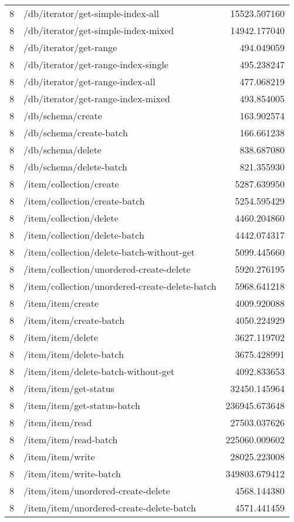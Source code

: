 \begin{longtable}{rlr}
8 & /db/iterator/get-simple-index-all & 15523.507160 \\
8 & /db/iterator/get-simple-index-mixed & 14942.177040 \\
8 & /db/iterator/get-range & 494.049059 \\
8 & /db/iterator/get-range-index-single & 495.238247 \\
8 & /db/iterator/get-range-index-all & 477.068219 \\
8 & /db/iterator/get-range-index-mixed & 493.854005 \\
8 & /db/schema/create & 163.902574 \\
8 & /db/schema/create-batch & 166.661238 \\
8 & /db/schema/delete & 838.687080 \\
8 & /db/schema/delete-batch & 821.355930 \\
8 & /item/collection/create & 5287.639950 \\
8 & /item/collection/create-batch & 5254.595429 \\
8 & /item/collection/delete & 4460.204860 \\
8 & /item/collection/delete-batch & 4442.074317 \\
8 & /item/collection/delete-batch-without-get & 5099.445660 \\
8 & /item/collection/unordered-create-delete & 5920.276195 \\
8 & /item/collection/unordered-create-delete-batch & 5968.641218 \\
8 & /item/item/create & 4009.920088 \\
8 & /item/item/create-batch & 4050.224929 \\
8 & /item/item/delete & 3627.119702 \\
8 & /item/item/delete-batch & 3675.428991 \\
8 & /item/item/delete-batch-without-get & 4092.833653 \\
8 & /item/item/get-status & 32450.145964 \\
8 & /item/item/get-status-batch & 236945.673648 \\
8 & /item/item/read & 27503.037626 \\
8 & /item/item/read-batch & 225060.009602 \\
8 & /item/item/write & 28025.223008 \\
8 & /item/item/write-batch & 349803.679412 \\
8 & /item/item/unordered-create-delete & 4568.144380 \\
8 & /item/item/unordered-create-delete-batch & 4571.441459 \\

\end{longtable}
